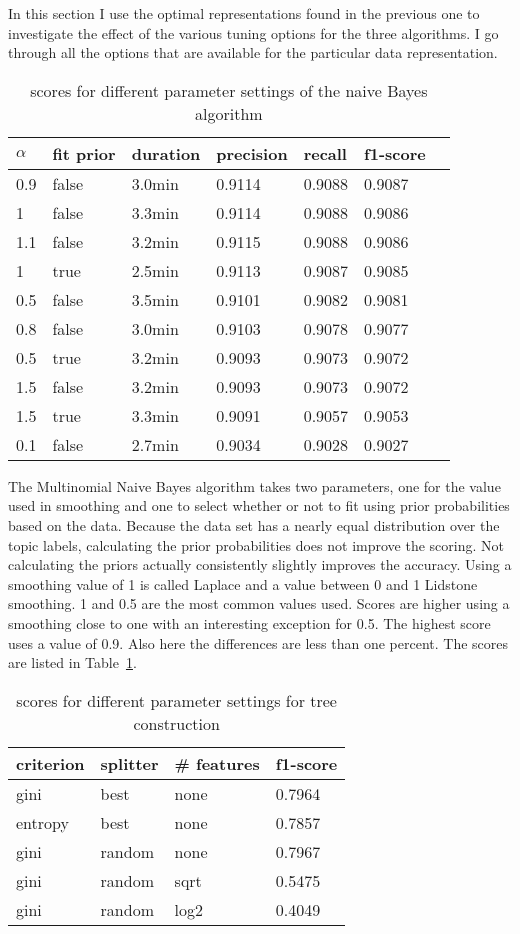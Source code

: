 \documentclass[11pt]{article}
\begin{document}
In this section I use the optimal representations found in the previous one to investigate the effect of the various tuning options for the three algorithms. I go through all the options that are available for the particular data representation.

\begin{table}[ht]\footnotesize
\centering
\begin{tabular}{ l l l l l l l }
$\alpha$  & fit prior & duration & precision & recall & f1-score \\
\hline
0.9 & false & 3.0min & 0.9114 & 0.9088 & 0.9087 \\
1 & false & 3.3min & 0.9114 & 0.9088 & 0.9086 \\
1.1 & false & 3.2min & 0.9115 & 0.9088 & 0.9086 \\
1 & true & 2.5min & 0.9113 & 0.9087 & 0.9085 \\
0.5 & false & 3.5min & 0.9101 & 0.9082 & 0.9081 \\
0.8 & false & 3.0min & 0.9103 & 0.9078 & 0.9077 \\
0.5 & true & 3.2min & 0.9093 & 0.9073 & 0.9072 \\
1.5 & false & 3.2min & 0.9093 & 0.9073 & 0.9072 \\
1.5 & true & 3.3min & 0.9091 & 0.9057 & 0.9053 \\
0.1 & false & 2.7min & 0.9034 & 0.9028 & 0.9027 \\
\end{tabular}
\caption{scores for different parameter settings of the naive Bayes algorithm}
\label{tab:tune-bayes}
\end{table}

The Multinomial Naive Bayes algorithm takes two parameters, one for the value used in smoothing and one to select whether or not to fit using prior probabilities based on the data. Because the data set has a nearly equal distribution over the topic labels, calculating the prior probabilities does not improve the scoring. Not calculating the priors actually consistently slightly improves the accuracy. Using a smoothing value of 1 is called Laplace and a value between 0 and 1 Lidstone smoothing. 1 and 0.5 are the most common values used. Scores are higher using a smoothing close to one with an interesting exception for 0.5. The highest score uses a value of 0.9. Also here the differences are less than one percent. The scores are listed in Table~\ref{tab:tune-bayes}.


\begin{table}[ht]\footnotesize
\centering
\begin{tabular}{ l l l l }
criterion & splitter & \# features & f1-score \\
\hline
gini & best & none &  0.7964 \\
entropy & best & none &  0.7857 \\
gini & random & none &  0.7967 \\
gini & random & sqrt & 0.5475 \\
gini & random & log2 & 0.4049 \\
\end{tabular}
\caption{scores for different parameter settings for tree construction}
\label{tab:tune-tree-split}
\end{table}
\end{document}
